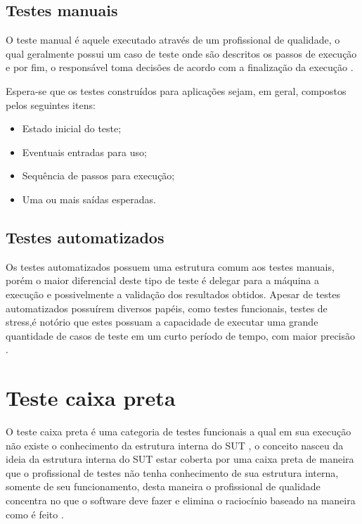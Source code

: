 \documentclass[
	12pt,				%
	oneside,			%
	a4paper,			%
	english,			%
	brazil				%
	]{abntex2ppgsi}
\begin{document}
\subsection{Testes manuais}
O teste manual  é aquele executado através de um profissional de qualidade, o qual geralmente possui um caso de teste onde são descritos os passos de execução e por fim, o responsável toma decisões de acordo com a finalização da execução \cite{Kaprocki2015}.

Espera-se que os testes construídos para aplicações sejam, em geral, compostos pelos seguintes itens:

\begin{itemize}
	\item Estado inicial do teste;
	\item Eventuais entradas para uso;
	\item Sequência de passos para execução; 
	\item Uma ou mais saídas esperadas.
\end{itemize}

\subsection{Testes automatizados}

Os testes automatizados possuem uma estrutura comum aos testes manuais, porém o maior diferencial deste tipo de teste é delegar para a máquina a execução e possivelmente a validação dos resultados obtidos. Apesar de testes automatizados possuírem diversos papéis, como testes funcionais, testes de stress,é notório que estes possuam a capacidade de executar uma grande quantidade de casos de teste em um curto período de tempo, com maior precisão \cite{Kaprocki2015}.

\section{Teste caixa preta}

O teste caixa preta é uma categoria de testes funcionais a qual em sua execução não existe o conhecimento da estrutura interna do SUT \cite{Xu2016},  o conceito nasceu da ideia da estrutura interna do SUT estar coberta por uma caixa preta de maneira que o profissional de testes não tenha conhecimento de sua estrutura interna, somente de seu funcionamento, desta maneira o profissional de qualidade concentra no que o software deve fazer e elimina o raciocínio baseado na maneira como é feito \cite{Jacob2016}.
\end{document}
